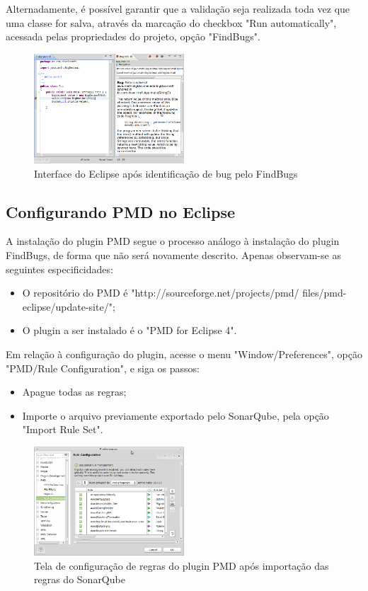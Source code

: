\documentclass[12pt,journal,compsoc]{IEEEtran}
\begin{document}
Alternadamente, é possível garantir que a validação seja realizada toda vez que uma classe for salva, através da marcação do checkbox "Run automatically", acessada pelas propriedades do projeto, opção "FindBugs".

\begin{figure}[ht!]
\centering
\includegraphics[width=0.5\textwidth]{img/eclipse-findbugs-09}
\caption{Interface do Eclipse após identificação de bug pelo FindBugs}
\label{eclipse-findbugs-09}
\end{figure} 


\subsection{Configurando PMD no Eclipse}

A instalação do plugin PMD\cite{pmd} segue o processo análogo à instalação do plugin FindBugs, de forma que não será novamente descrito. Apenas observam-se as seguintes especificidades:

\begin{itemize}
\item O repositório do PMD é "http://sourceforge.net/projects/pmd/
files/pmd-eclipse/update-site/";
\item O plugin a ser instalado é o "PMD for Eclipse 4".
\end{itemize}
  
Em relação à configuração do plugin, acesse o menu "Window/Preferences", opção "PMD/Rule Configuration", e siga os passos:

\begin{itemize}
\item Apague todas as regras;
\item Importe o arquivo previamente exportado pelo SonarQube, pela opção "Import Rule Set".
\end{itemize}

\begin{figure}[ht!]
\centering
\includegraphics[width=0.5\textwidth]{img/eclipse-pmd-01}
\caption{Tela de configuração de regras do plugin PMD após importação das regras do SonarQube}
\label{eclipse-pmd-01}
\end{figure}
\end{document}
